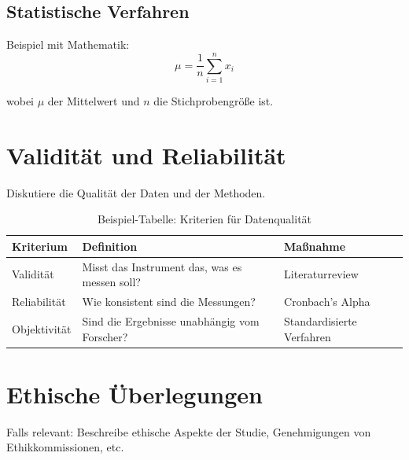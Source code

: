 \subsection{Statistische Verfahren}

Beispiel mit Mathematik:
\begin{equation}
    \mu = \frac{1}{n} \sum_{i=1}^{n} x_i
\end{equation}

wobei $\mu$ der Mittelwert und $n$ die Stichprobengröße ist.

\section{Validität und Reliabilität}
\label{sec:meth:validity}

Diskutiere die Qualität der Daten und der Methoden.

\begin{table}[H]
    \centering
    \caption{Beispiel-Tabelle: Kriterien für Datenqualität}
    \label{tab:quality}
    \begin{tabular}{lll}
        \toprule
        \textbf{Kriterium} & \textbf{Definition}                           & \textbf{Maßnahme}         \\
        \midrule
        Validität          & Misst das Instrument das, was es messen soll? & Literaturreview           \\
        Reliabilität       & Wie konsistent sind die Messungen?            & Cronbach's Alpha          \\
        Objektivität       & Sind die Ergebnisse unabhängig vom Forscher?  & Standardisierte Verfahren \\
        \bottomrule
    \end{tabular}
\end{table}

\section{Ethische Überlegungen}
\label{sec:meth:ethics}

Falls relevant: Beschreibe ethische Aspekte der Studie,
Genehmigungen von Ethikkommissionen, etc.
